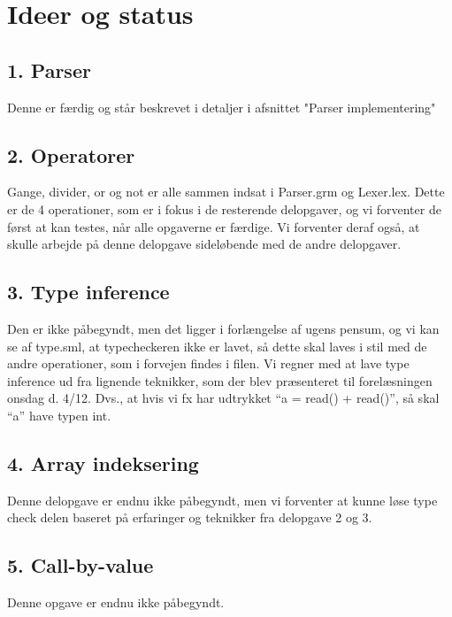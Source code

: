 \documentclass[11pt,a4paper]{article}
\begin{document}
\section*{Ideer og status}
\subsection*{1. Parser}
Denne er færdig og står beskrevet i detaljer i afsnittet "Parser implementering"
\subsection*{2. Operatorer}
Gange, divider, or og not er alle sammen indsat i Parser.grm og Lexer.lex.
Dette er de 4 operationer, som er i fokus i de resterende delopgaver,
og vi forventer de først at kan testes, når alle opgaverne er færdige.
Vi forventer deraf også, at skulle arbejde på denne delopgave sideløbende
med de andre delopgaver.
\subsection*{3. Type inference}
Den er ikke påbegyndt, men det ligger i forlængelse af ugens pensum, og vi kan se af type.sml,
at typecheckeren ikke er lavet, så dette skal laves i stil med de andre operationer,
som i forvejen findes i filen. Vi regner med at lave type inference ud fra
lignende teknikker, som der blev præsenteret til forelæsningen onsdag d. 4/12.
Dvs., at hvis vi fx har udtrykket ``a = read() + read()'', så skal ``a'' have typen
int.
\subsection*{4. Array indeksering}
Denne delopgave er endnu ikke påbegyndt, men vi forventer
at kunne løse type check delen baseret på erfaringer og
teknikker fra delopgave 2 og 3.
\subsection*{5. Call-by-value}
Denne opgave er endnu ikke påbegyndt.
\end{document}
